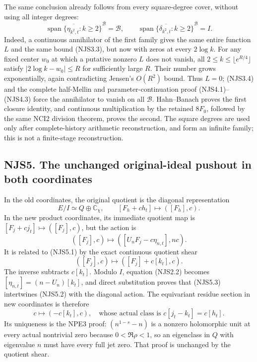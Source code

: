 The same conclusion already follows from every square-degree cover,
without using all integer degrees: \[
\overline{\operatorname{span}\{\eta_{k^2,t}:k\ge2\}}^{\mathcal B}=\mathcal B,
\qquad
\overline{\operatorname{span}\{\delta_{k^2,t}:k\ge2\}}^{\mathcal B}=I.
\tag{NJS4.5}
\] Indeed, a continuous annihilator of the first family gives the same
entire function \(L\) and the same bound (NJS3.3), but now with zeros at
every \(2\log k\). For any fixed center \(w_0\) at which a putative
nonzero \(L\) does not vanish, all \(2\le k\le\lfloor e^{R/4}\rfloor\)
satisfy \(|2\log k-w_0|\le R\) for sufficiently large \(R\). Their
number grows exponentially, again contradicting Jensen's \(O(R^2)\)
bound. Thus \(L=0\); (NJS3.4) and the complete half-Mellin and
parameter-continuation proof (NJS4.1)--(NJS4.3) force the annihilator to
vanish on all \(\mathcal B\). Hahn--Banach proves the first closure
identity, and continuous multiplication by the retained \(8F_0\),
followed by the same NCI2 division theorem, proves the second. The
square degrees are used only after complete-history arithmetic
reconstruction, and form an infinite family; this is not a finite-stage
reconstruction.

\subsection{NJS5. The unchanged original-ideal pushout in both
coordinates}\label{njs5.-the-unchanged-original-ideal-pushout-in-both-coordinates}

In the old coordinates, the original quotient is the diagonal
representation \[
E/I\simeq Q\oplus\mathbb C_\chi,
\qquad [F_h+ch_t]\longmapsto([F_h],c).
\tag{NJS5.1}
\] In the new product coordinates, its immediate quotient map is
\([F_j+cj_t]\mapsto([F_j],c)\), but the action is \[
([F_j],c)\longmapsto([U_nF_j-c\eta_{n,t}],nc).
\tag{NJS5.2}
\] It is related to (NJS5.1) by the exact continuous quotient shear \[
([F_j],c)\longmapsto([F_j]+c[k_t],c).
\tag{NJS5.3}
\] The inverse subtracts \(c[k_t]\). Modulo \(I\), equation (NJS2.2)
becomes \([\eta_{n,t}]=(n-U_n)[k_t]\), and direct substitution proves
that (NJS5.3) intertwines (NJS5.2) with the diagonal action. The
equivariant residue section in new coordinates is therefore \[
c\longmapsto(-c[k_t],c),
\quad\text{whose actual class is }c[j_t-k_t]=c[h_t].
\tag{NJS5.4}
\] Its uniqueness is the NPE3 proof: \((n^{1-s}-n)\) is a nonzero
holomorphic unit at every actual nontrivial zero because
\(0<\Re\rho<1\), so an eigenclass in \(Q\) with eigenvalue \(n\) must
have every full jet zero. That proof is unchanged by the quotient shear.

